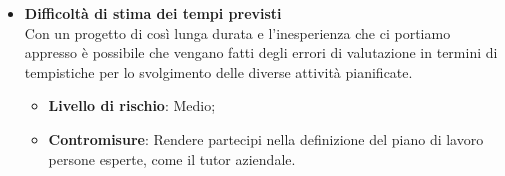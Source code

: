\begin{itemize}
\begin{itemize}
	      \end{itemize}
	\item \textbf{Difficoltà di stima dei tempi previsti}\\
	      Con un progetto di così lunga durata e l'inesperienza che ci portiamo appresso è possibile che vengano fatti degli errori di valutazione in termini di tempistiche per lo svolgimento delle diverse attività pianificate.
	      \begin{itemize}
	      	\item \textbf{Livello di rischio}: Medio;
	      	\item \textbf{Contromisure}: Rendere partecipi nella definizione del piano di lavoro persone esperte, come il tutor aziendale.
	      \end{itemize}
\end{itemize}
